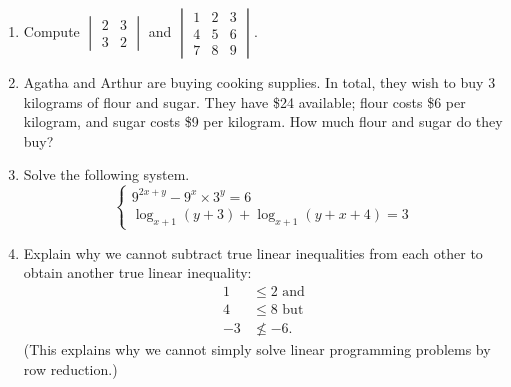 \documentclass[a4paper,leqno]{article}
\numberwithin{equation}{section}
\theoremstyle{definition}
\theoremstyle{remark}
\begin{document}
\begin{enumerate}
\begin{center}
    \end{center}
  \item Compute $ \begin{vmatrix} 2 & 3\\3 & 2 \end{vmatrix} $ and $ \begin{vmatrix} 1 & 2 & 3 \\ 4 & 5 & 6 \\ 7 & 8 & 9 \end{vmatrix} $.
  \item Agatha and Arthur are buying cooking supplies. In total, they wish to buy 3 kilograms of flour and sugar. They
        have \$24 available; flour costs \$6 per kilogram, and sugar costs \$9 per kilogram. How much flour and sugar do they buy?
  \item Solve the following system.
        \begin{displaymath}
          \begin{cases}
          9^{2x+y} - 9^x \times 3^y = 6\\
          \log_{x+1}(y+3) + \log_{x+1}(y+x+4) = 3
          \end{cases}
        \end{displaymath}
  \item Explain why we cannot subtract true linear inequalities from each other to obtain another true linear inequality:
        \begin{align*}
          1 &\leq 2 \text{ and}\\
          4 &\leq 8 \text{ but}\\
          -3 &\not\leq -6.
        \end{align*}
        (This explains why we cannot simply solve linear programming problems by row reduction.)

\end{enumerate}
\end{document}
